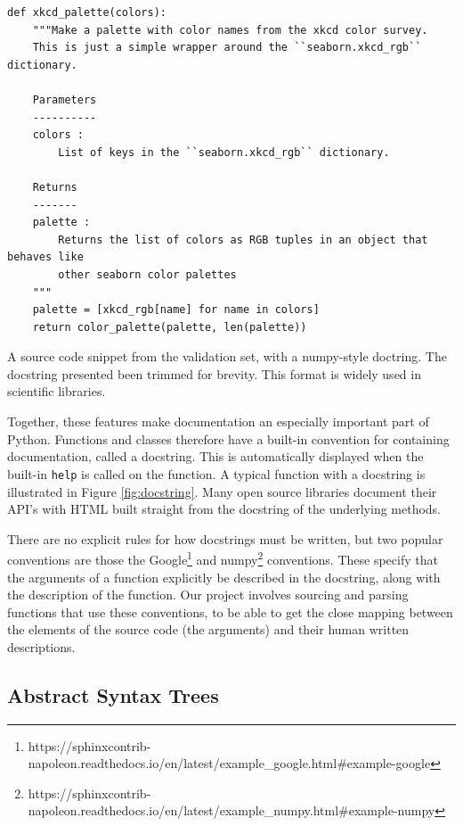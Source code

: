 \begin{listing}[h!] 

\begin{verbatim}
def xkcd_palette(colors):
    """Make a palette with color names from the xkcd color survey.
    This is just a simple wrapper around the ``seaborn.xkcd_rgb`` dictionary.

    Parameters
    ----------
    colors : 
        List of keys in the ``seaborn.xkcd_rgb`` dictionary.

    Returns
    -------
    palette : 
        Returns the list of colors as RGB tuples in an object that behaves like
        other seaborn color palettes
    """
    palette = [xkcd_rgb[name] for name in colors]
    return color_palette(palette, len(palette))

\end{verbatim}

    \caption{A source code snippet from the validation set, with a numpy-style doctring. The docstring presented been trimmed for brevity. This format is widely used in scientific libraries.}
    \label{fig:docstring}
\end{listing}




Together, these features make documentation an especially important part of Python. 
Functions and classes therefore have a built-in convention for containing documentation, called a docstring. 
This is automatically displayed when the built-in \texttt{help} is called on the function.
A typical function with a docstring is illustrated in Figure \ref{fig:docstring}. 
Many open source libraries document their API's with HTML built straight from the docstring of the underlying methods.

There are no explicit rules for how docstrings must be written, but two popular conventions are those the Google\footnote{https://sphinxcontrib-napoleon.readthedocs.io/en/latest/example\_google.html\#example-google} and numpy\footnote{https://sphinxcontrib-napoleon.readthedocs.io/en/latest/example\_numpy.html\#example-numpy} conventions. These specify that the arguments of a function explicitly be described in the docstring, along with the description of the function.
Our project involves sourcing and parsing functions that use these conventions, to be able to get the close mapping between the elements of the source code (the arguments) and their human written descriptions. 


\subsection{Abstract Syntax Trees} %
\label{sub:abstract_syntax_trees}

